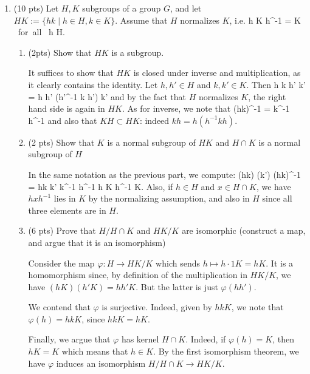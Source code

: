 \documentclass[11pt,reqno]{amsart}
\newcommand{\rr}{\rightarrow}
\begin{document}
\begin{enumerate}
\begin{solutionbox}
	
\end{solutionbox}

\vspace{0.15in} 


\clearpage
\item (10 pts) Let $H, K$ subgroups of a group $G$, and let $HK:= \{ hk \mid h \in H, k \in K \}.$ Assume that $H$ normalizes $K$, i.e. \be h K h^{-1} = K \mbox{ for all } h \in H. \ee
\begin{enumerate}
	\item (2pts) Show that $HK$ is a subgroup. 
	
	\begin{solutionbox}
		It suffices to show that $HK$ is closed under inverse and multiplication, as it clearly contains the identity. Let $h, h' \in H$ and $k, k' \in K$. Then \be h k h' k' = h h' (h'^{-1} k h') k' \ee and by the fact that $H$ normalizes $K$, the right hand side is again in $HK$. As for inverse, we note that \be (hk)^{-1} = k^{-1} h^{-1} \ee and also that $KH \subset HK$: indeed $k h = h (h^{-1} k h)$.
	\end{solutionbox}
	\item (2 pts) Show that $K$ is a normal subgroup of $HK$
	 and $H \cap K$ is a normal subgroup of $H$
	\begin{solutionbox} In the same notation as the previous part, we compute: 
		\be (hk) (k') (hk)^{-1} = hk k' k^{-1} h^{-1}  \in h K h^{-1} \subset K. \ee 
	Also, if $h \in H$ and $x \in H \cap K$, we have $h x h^{-1}$ lies in $K$ by the normalizing assumption, and also in $H$ since all three elements are in $H$.	
		
	\end{solutionbox}
	\item (6 pts) Prove that $H/H \cap K$ and $HK/K$ are isomorphic (construct a map, and argue that it is an isomorphism)
	
	\begin{solutionbox}
	Consider the map $\varphi:H \rr HK/K$ which sends $h \mapsto  h\cdot1K= hK$. It is a homomorphism since, by definition of the multiplication in $HK/K$, we have $(hK )(h' K) = h h' K.$ But the latter is just $\varphi(hh')$. 
	
	We contend that $\varphi$ is surjective. Indeed, given by $hkK$, we note that $\varphi(h) = hkK$, since $hkK= hK$.
	
	Finally, we argue that $\varphi$ has kernel $H \cap K$. Indeed, if $\varphi(h)=K$, then $hK=K$ which means that $h \in K$. By the first isomorphism theorem, we have $\varphi$ induces an isomorphism $H/H \cap K \rr HK/K$.		
	\end{solutionbox}
\end{enumerate}


\end{enumerate}
\end{document}
